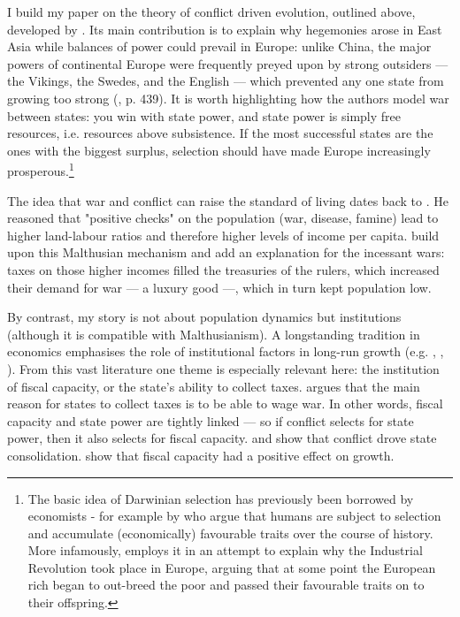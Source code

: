 \documentclass[11pt, a4paper]{article}
\begin{document}
I build my paper on the theory of conflict driven evolution, outlined above, developed by \cite{levine2013, levine2021, levine2022}. Its main contribution is to explain why hegemonies arose in East Asia while balances of power could prevail in Europe: unlike China, the major powers of continental Europe were frequently preyed upon by strong outsiders --- the Vikings, the Swedes, and the English --- which prevented any one state from growing too strong (\citealp{levine2021}, p. 439). It is worth highlighting how the authors model war between states: you win with state power, and state power is simply free resources, i.e. resources above subsistence. If the most successful states are the ones with the biggest surplus, selection should have made Europe increasingly prosperous.\footnote
{
The basic idea of Darwinian selection has previously been borrowed by economists - for example by \cite{galor2002} who argue that humans are subject to selection and accumulate (economically) favourable traits over the course of history. More infamously, \cite{clark2007} employs it in an attempt to explain why the Industrial Revolution took place in Europe, arguing that at some point the European rich began to out-breed the poor and passed their favourable traits on to their offspring.
}

The idea that war and conflict can raise the standard of living dates back to \cite{malthus1798}. He reasoned that "positive checks" on the population (war, disease, famine) lead to higher land-labour ratios and therefore higher levels of income per capita. \cite{voigtlnder2013} build upon this Malthusian mechanism and add an explanation for the incessant wars: taxes on those higher incomes filled the treasuries of the rulers, which increased their demand for war --- a luxury good ---, which in turn kept population low. 

By contrast, my story is not about population dynamics but institutions (although it is compatible with Malthusianism). A longstanding tradition in economics emphasises the role of institutional factors in long-run growth (e.g. \cite{north1970}, \cite{delong1993}, \cite{ajr2001}). From this vast literature one theme is especially relevant here: the institution of fiscal capacity, or the state's ability to collect taxes. \cite{tilly1985} argues that the main reason for states to collect taxes is to be able to wage war. In other words, fiscal capacity and state power are tightly linked --- so if conflict selects for state power, then it also selects for fiscal capacity. \cite{gennaioli2015} and \cite{cantoni2023} show that conflict drove state consolidation. \cite{dincecco2012} show that fiscal capacity had a positive effect on growth.
\end{document}
